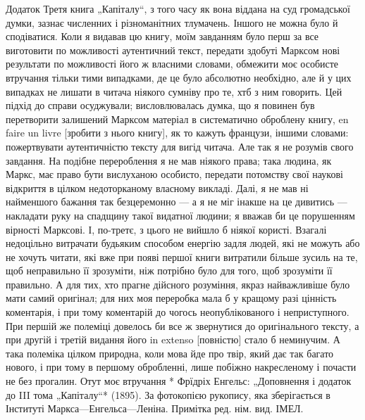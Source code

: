 Додаток
Третя книга „Капіталу“, з того часу як вона віддана на суд громадської думки, зазнає численних і
різноманітних тлумачень. Іншого не можна було й сподіватися. Коли я видавав цю книгу, моїм
завданням було перш за все виготовити по можливості аутентичний текст, передати здобуті Марксом
нові результати по можливості його ж власними словами, обмежити моє особисте втручання тільки тими випадками, де це було абсолютно необхідно, але й у цих випадках не лишати в читача ніякого
сумніву про те, хтб з ним говорить. Цей підхід до справи осуджували; висловлювалась думка, що я
повинен був перетворити залишений Марксом матеріал в систематично оброблену книгу, en faire un
livre [зробити з нього книгу], як то кажуть французи, іншими словами: пожертвувати аутентичністю
тексту для вигід читача. Але так я не розумів свого завдання. На подібне перероблення я не мав
ніякого права; така людина, як Маркс, має право бути вислуханою особисто, передати потомству
свої наукові відкриття в цілком недоторканому власному викладі. Далі, я не мав ні найменшого
бажання так безцеремонно — а я не міг інакше на це дивитись — накладати руку на спадщину такої видатної людини; я вважав би це порушенням вірності Марксові. І, по-третє, з цього не вийшло б
ніякої користі. Взагалі недоцільно витрачати будьяким способом енергію задля людей, які не можуть або не хочуть читати, які вже при появі першої книги витратили більше зусиль на те, щоб
неправильно її зрозуміти, ніж потрібно було для того, щоб зрозуміти її правильно. А для тих, хто
прагне дійсного розуміння, якраз найважливіше було мати самий оригінал; для них моя переробка
мала б у кращому разі цінність коментарія, і при тому коментарій до чогось неопублікованого і
неприступного. При першій же полеміці довелось би все ж звернутися до оригінального тексту, а
при другій і третій видання його in extenso [повністю] стало б неминучим. А така полеміка цілком
природна, коли мова йде про твір, який дає так багато нового, і при тому в першому обробленні,
лише побіжно накресленому і почасти не без прогалин. Отут моє втручання
* Фрїдріх Енгельс: „Доповнення і додаток до III тома „Капіталу“* (1895). За фотокопією рукопису,
яка зберігається в Інституті Маркса—Енгельса—Леніна. Примітка ред. нім. вид. ІМЕЛ.
\parbreak{}  %
